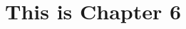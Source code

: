 \documentclass[../main/thesis.tex]{subfiles}
\begin{document}
\chapter{This is Chapter 6}
\label{ch:6}



\bib
\end{document}
